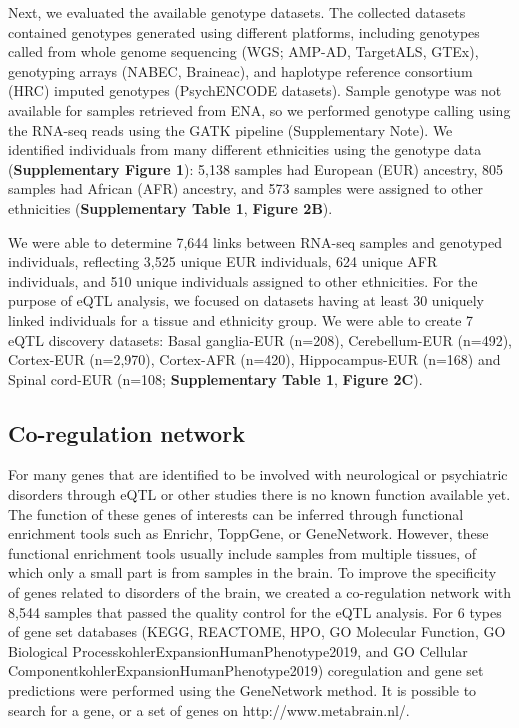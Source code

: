 Next, we evaluated the available genotype datasets. The collected datasets contained genotypes generated using different platforms, including genotypes called from whole genome sequencing (WGS; AMP-AD\cite{hodesAcceleratingMedicinesPartnership2016a}, TargetALS\cite{prudencioDistinctBrainTranscriptome2015}, GTEx\cite{donovanCellularDeconvolutionGTEx2020}), genotyping arrays (NABEC\cite{DbGaPStudya}, Braineac\cite{ramasamyGeneticVariabilityRegulation2014}), and haplotype reference consortium (HRC)\cite{mccarthyReferencePanel642016} imputed genotypes (PsychENCODE datasets). Sample genotype was not available for samples retrieved from ENA, so we performed genotype calling using the RNA-seq reads using the GATK\cite{mckennaGenomeAnalysisToolkit2010} pipeline (Supplementary Note). We identified individuals from many different ethnicities using the genotype data (\textbf{Supplementary Figure 1}): 5,138 samples had European (EUR) ancestry, 805 samples had African (AFR) ancestry, and 573 samples were assigned to other ethnicities (\textbf{Supplementary Table 1}, \textbf{Figure 2B}). 

We were able to determine 7,644 links between RNA-seq samples and genotyped individuals, reflecting 3,525 unique EUR individuals, 624 unique AFR individuals, and 510 unique individuals assigned to other ethnicities. For the purpose of eQTL analysis, we focused on datasets having at least 30 uniquely linked individuals for a tissue and ethnicity group. We were able to create 7 eQTL discovery datasets: Basal ganglia-EUR (n=208), Cerebellum-EUR (n=492), Cortex-EUR (n=2,970), Cortex-AFR (n=420), Hippocampus-EUR (n=168) and Spinal cord-EUR (n=108; \textbf{Supplementary Table 1}, \textbf{Figure 2C}). 

\subsection{Co-regulation network }
For many genes that are identified to be involved with neurological or psychiatric disorders through eQTL or other studies there is no known function available yet. The function of these genes of interests can be inferred through functional enrichment tools such as Enrichr\cite{chenEnrichrInteractiveCollaborative2013,EnrichrComprehensiveGene}, ToppGene\cite{chenToppGeneSuiteGene2009}, or GeneNetwork\cite{deelenImprovingDiagnosticYield2019}. However, these functional enrichment tools usually include samples from multiple tissues, of which only a small part is from samples in the brain. To improve the specificity of genes related to disorders of the brain, we created a co-regulation network with 8,544 samples that passed the quality control for the eQTL analysis. For 6 types of gene set databases (KEGG\cite{kanehisaKEGGKyotoEncyclopedia2000}, REACTOME\cite{jassalReactomePathwayKnowledgebase2020}, HPO\cite{kohlerExpansionHumanPhenotype2019}, GO Molecular Function\cite{kohlerExpansionHumanPhenotype2019}, GO Biological ProcesskohlerExpansionHumanPhenotype2019, and GO Cellular ComponentkohlerExpansionHumanPhenotype2019) coregulation and gene set predictions were performed using the GeneNetwork method\cite{deelenImprovingDiagnosticYield2019}. It is possible to search for a gene, or a set of genes on http://www.metabrain.nl/. 

